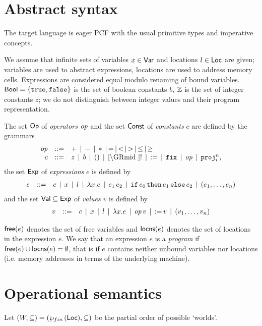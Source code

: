 \documentclass[12pt,a4paper]{article}
\begin{document}

\section{Abstract syntax}

The target language is eager PCF with the usual primitive types and imperative concepts.

We assume that infinite sets of variables $x \in \mathsf{Var}$ and locations $l \in \mathsf{Loc}$ are given;
variables are used to abstract expressions, locations are used to address memory cells.
Expressions are considered equal modulo renaming of bound variables.
$\mathsf{Bool}=\{\mathtt{true},\mathtt{false}\}$ is the set of boolean constants $b$, $\mathbb Z$ is the set of integer
constants $z$; we do not distinguish between integer values and their program representation.

\begin{definition}[Expressions]
  The set $\mathsf{Op}$ of {\em operators} $\mathit{op}$ and the set $\mathsf{Const}$ of {\em constants} $c$
  are defined by the grammars
  \[\GRbeg
    \op \GRis + \GRmid - \GRmid * \GRmid = \GRmid < \GRmid > \GRmid \le \GRmid \ge \\
    c \GRis z \GRmid b \GRmid \unit \GRmid \cref \GRmid !
             \GRmid \assign \GRmid \fix \GRmid \op \GRmid \proj{n}{i},
  \GRend\]
  the set $\mathsf{Exp}$ of {\em expressions} $e$ is defined by
  \[\begin{array}{rrlll}
    e & ::= & c \,\mid\, x \,\mid\, l \,\mid\, \lambda x.e \,\mid\, e_1\,e_2
      \,\mid\, \mathtt{if}\,e_0\,\mathtt{then}\,e_1\,\mathtt{else}\,e_2 \,\mid\, (e_1,\ldots,e_n)
  \end{array}\]
  and the set $\mathsf{Val} \subseteq \mathsf{Exp}$ of {\em values} $v$ is defined by
  \[\begin{array}{rrlll}
    v & ::= & c \,\mid\, x \,\mid\, l \,\mid\, \lambda x.e \,\mid\, \mathit{op}\,v \,\mid\, \mathtt{:=}\,v
      \,\mid\, (v_1,\ldots,v_n)
  \end{array}\]
\end{definition}

$\mathsf{free}(e)$ denotes the set of free variables and $\mathsf{locns}(e)$ denotes the set of locations in the
expression $e$. We say that an expression $e$ is a {\em program} if $\mathsf{free}(e)\cup\mathsf{locns}(e)=\emptyset$,
that is if $e$ contains neither unbound variables nor locations (i.e. memory addresses in terms
of the underlying machine).



\section{Operational semantics}

Let $(W,\subseteq) = (\wp_{fin}\,(\mathsf{Loc}),\subseteq)$ be the partial order of possible `worlds'.
\end{document}
